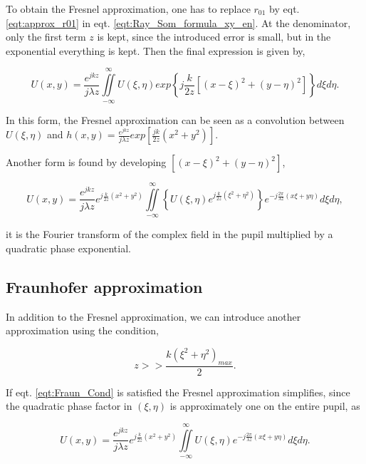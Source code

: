 To obtain the Fresnel approximation, one has to replace $r_{01}$ by eqt. \eqref{eqt:approx_r01} in eqt. \eqref{eqt:Ray_Som_formula_xy_en}. At the denominator, only the first term $z$ is kept, since the introduced error is small, but in the exponential everything is kept. Then the final expression is given by,

\begin{equation}
U(x,y) = \frac{e^{jkz}}{j\lambda z} \iint\limits_{-\infty}^{\infty} U(\xi,\eta)exp \left\lbrace j \frac{k}{2z}\left[(x-\xi)^2+(y-\eta)^2\right]\right\rbrace d\xi d\eta.
\label{eqt:fresnel_Approx_conv}
\end{equation}

In this form, the Fresnel approximation can be seen as a convolution between $U(\xi,\eta)$ and $h(x,y) = \frac{e^{jkz}}{j\lambda z}exp\left[\frac{jk}{2z}\left(x^2+y^2\right)\right]$.

Another form is found by developing $\left[(x-\xi)^2+(y-\eta)^2\right]$,

\begin{equation}
U(x,y) = \frac{e^{jkz}}{j\lambda z} e^{j\frac{k}{2z}(x^2+y^2)} \iint\limits_{-\infty}^{\infty} \left\lbrace U(\xi,\eta) e^{j\frac{k}{2z}(\xi^2+\eta^2)}\right\rbrace e^{-j\frac{2\pi}{\lambda z}(x\xi+y\eta)} d\xi d\eta,
\label{eqt:fresnel_Approx_FT}
\end{equation}

it is the Fourier transform of the complex field in the pupil multiplied by a quadratic phase exponential.

\subsection{Fraunhofer approximation}
\label{subsec:FraunhoferApprox}

In addition to the Fresnel approximation, we can introduce another approximation using the condition,

\begin{equation}
z >> \frac{k(\xi^2+\eta^2)_{max}}{2}.
\label{eqt:Fraun_Cond}
\end{equation}

If eqt. \eqref{eqt:Fraun_Cond} is satisfied the Fresnel approximation simplifies, since the quadratic phase factor in $(\xi,\eta)$ is approximately one on the entire pupil, as

\begin{equation}
U(x,y) = \frac{e^{jkz}}{j\lambda z} e^{j\frac{k}{2z}(x^2+y^2)} \iint\limits_{-\infty}^{\infty} U(\xi,\eta) e^{-j\frac{2\pi}{\lambda z}(x\xi+y\eta)} d\xi d\eta.
\label{eqt:Fraunhofer_approx}  
\end{equation}

